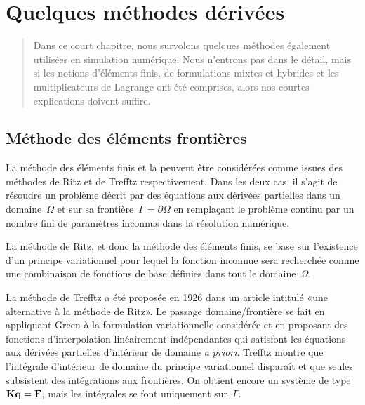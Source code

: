 \chapter{Quelques méthodes dérivées}\label{Ch-XFEM}
\begin{abstract}
Dans ce court chapitre, nous survolons quelques méthodes également utilisées en simulation numérique. Nous n'entrons pas dans le détail, mais si les notions d'éléments finis, de formulations mixtes et hybrides et les multiplicateurs de Lagrange ont été comprises, alors nos courtes explications doivent suffire.
\end{abstract}

\medskip
\section{Méthode des éléments frontières}\label{Sec-BEM}

La méthode des éléments finis et la  peuvent être considérées comme issues des méthodes de Ritz et de Trefftz respectivement. Dans les deux cas, il s'agit de résoudre un problème décrit par des équations aux dérivées partielles dans un domaine~$\Omega$ et sur sa frontière~$\Gamma=\partial\Omega$ en remplaçant le problème continu par un nombre fini de paramètres inconnus dans la résolution numérique.

\medskip
La méthode de Ritz, et donc la méthode des éléments finis, se base sur l'existence d'un principe variationnel pour lequel la fonction inconnue sera recherchée comme une combinaison de fonctions de base définies dans tout le domaine~$\Omega$.

\medskip
La méthode de Trefftz a été proposée en 1926 dans un article intitulé «une alternative à la méthode de Ritz». Le passage domaine/frontière se fait en appliquant Green à la formulation variationnelle considérée et en proposant des fonctions d'interpolation linéairement indépendantes qui satisfont les équations aux dérivées partielles d'intérieur de domaine \emph{a priori}. Trefftz montre que l'intégrale d'intérieur de domaine du principe variationnel disparaît et que seules subsistent des intégrations aux frontières.  On obtient encore un système de type~$\MM{K}\VV{q}=\VV{F}$, mais les intégrales se font uniquement sur~$\Gamma$.

